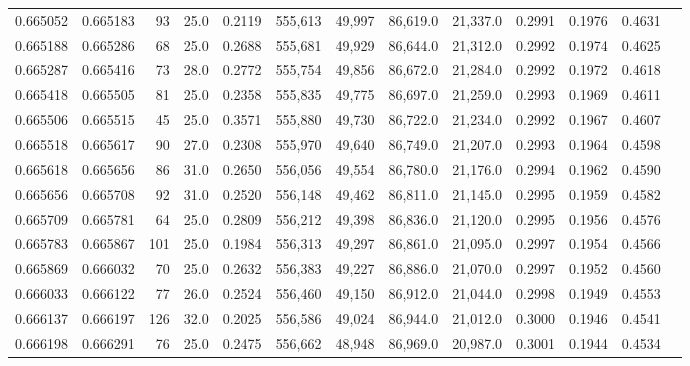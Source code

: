 \begin{tabular}{rrrrrrrrrrrrr}
0.665052 & 0.665183 &    93 & 25.0 &                                     0.2119 & 555,613 &  49,997 &  86,619.0 &  21,337.0 & 0.2991 & 0.1976 & 0.4631 \\
0.665188 & 0.665286 &    68 & 25.0 &                                     0.2688 & 555,681 &  49,929 &  86,644.0 &  21,312.0 & 0.2992 & 0.1974 & 0.4625 \\
0.665287 & 0.665416 &    73 & 28.0 &                                     0.2772 & 555,754 &  49,856 &  86,672.0 &  21,284.0 & 0.2992 & 0.1972 & 0.4618 \\
0.665418 & 0.665505 &    81 & 25.0 &                                     0.2358 & 555,835 &  49,775 &  86,697.0 &  21,259.0 & 0.2993 & 0.1969 & 0.4611 \\
0.665506 & 0.665515 &    45 & 25.0 &                                     0.3571 & 555,880 &  49,730 &  86,722.0 &  21,234.0 & 0.2992 & 0.1967 & 0.4607 \\
0.665518 & 0.665617 &    90 & 27.0 &                                     0.2308 & 555,970 &  49,640 &  86,749.0 &  21,207.0 & 0.2993 & 0.1964 & 0.4598 \\
0.665618 & 0.665656 &    86 & 31.0 &                                     0.2650 & 556,056 &  49,554 &  86,780.0 &  21,176.0 & 0.2994 & 0.1962 & 0.4590 \\
0.665656 & 0.665708 &    92 & 31.0 &                                     0.2520 & 556,148 &  49,462 &  86,811.0 &  21,145.0 & 0.2995 & 0.1959 & 0.4582 \\
0.665709 & 0.665781 &    64 & 25.0 &                                     0.2809 & 556,212 &  49,398 &  86,836.0 &  21,120.0 & 0.2995 & 0.1956 & 0.4576 \\
0.665783 & 0.665867 &   101 & 25.0 &                                     0.1984 & 556,313 &  49,297 &  86,861.0 &  21,095.0 & 0.2997 & 0.1954 & 0.4566 \\
0.665869 & 0.666032 &    70 & 25.0 &                                     0.2632 & 556,383 &  49,227 &  86,886.0 &  21,070.0 & 0.2997 & 0.1952 & 0.4560 \\
0.666033 & 0.666122 &    77 & 26.0 &                                     0.2524 & 556,460 &  49,150 &  86,912.0 &  21,044.0 & 0.2998 & 0.1949 & 0.4553 \\
0.666137 & 0.666197 &   126 & 32.0 &                                     0.2025 & 556,586 &  49,024 &  86,944.0 &  21,012.0 & 0.3000 & 0.1946 & 0.4541 \\
0.666198 & 0.666291 &    76 & 25.0 &                                     0.2475 & 556,662 &  48,948 &  86,969.0 &  20,987.0 & 0.3001 & 0.1944 & 0.4534 \\

\end{tabular}
